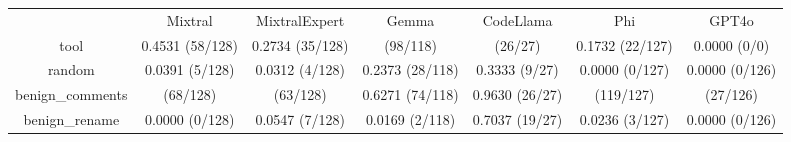 \begin{table}[h!]
\centering
\begin{tabular}{|c|c|c|c|c|c|c|}
\hline
 & Mixtral & MixtralExpert & Gemma & CodeLlama & Phi & GPT4o \\

tool & 0.4531 (58/128) & 0.2734 (35/128) & \cellcolor{blue!10}{0.8305} (98/118) & \cellcolor{blue!10}{0.9630} (26/27) & 0.1732 (22/127) & 0.0000 (0/0) \\

random & 0.0391 (5/128) & 0.0312 (4/128) & 0.2373 (28/118) & 0.3333 (9/27) & 0.0000 (0/127) & 0.0000 (0/126) \\

benign_comments & \cellcolor{blue!10}{0.5312} (68/128) & \cellcolor{blue!10}{0.4922} (63/128) & 0.6271 (74/118) & 0.9630 (26/27) & \cellcolor{blue!10}{0.9370} (119/127) & \cellcolor{blue!10}{0.2143} (27/126) \\

benign_rename & 0.0000 (0/128) & 0.0547 (7/128) & 0.0169 (2/118) & 0.7037 (19/27) & 0.0236 (3/127) & 0.0000 (0/126) \\

\end{tabular}
\end{table}